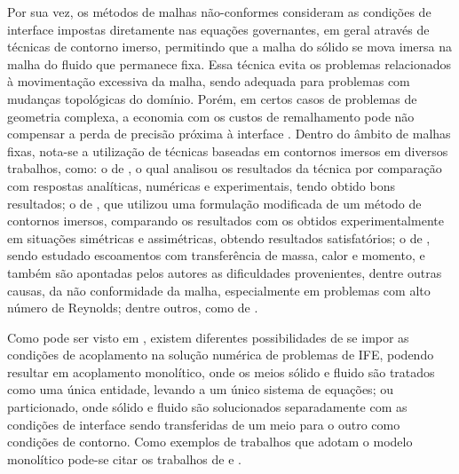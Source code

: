 Por sua vez, os métodos de malhas não-conformes consideram as condições de interface impostas diretamente nas equações governantes, em geral através de técnicas de contorno imerso, permitindo que a malha do sólido se mova imersa na malha do fluido que permanece fixa. Essa técnica evita os problemas relacionados à movimentação excessiva da malha, sendo adequada para problemas com mudanças topológicas do domínio. Porém, em certos casos de problemas de geometria complexa, a economia com os custos de remalhamento pode não compensar a perda de precisão próxima à interface \cite{bazilevs2013computational,hou2012numerical,bazilevs2015ale}. Dentro do âmbito de malhas fixas, nota-se a utilização de técnicas baseadas em contornos imersos em diversos trabalhos, como: o de , o qual analisou os resultados da técnica por comparação com respostas analíticas, numéricas e experimentais, tendo obtido bons resultados; o de , que utilizou uma formulação modificada de um método de contornos imersos, comparando os resultados com os obtidos experimentalmente em situações simétricas e assimétricas, obtendo resultados satisfatórios; o de , sendo estudado escoamentos com transferência de massa, calor e momento, e também são apontadas pelos autores as dificuldades provenientes, dentre outras causas, da não conformidade da malha, especialmente em problemas com alto número de Reynolds; dentre outros, como de .

Como pode ser visto em , existem diferentes possibilidades de se impor as condições de acoplamento na solução numérica de problemas de IFE, podendo resultar em acoplamento monolítico, onde os meios sólido e fluido são tratados como uma única entidade, levando a um único sistema de equações; ou particionado, onde sólido e fluido são solucionados separadamente com as condições de interface sendo transferidas de um meio para o outro como condições de contorno. Como exemplos de trabalhos que adotam o modelo monolítico pode-se citar os trabalhos de  e .

